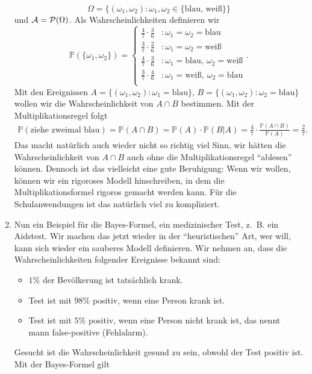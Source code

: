 \begin{beispiel}
\begin{enumerate}[label=(\roman*)]
		$$\Omega = \{ (\omega_1,\omega_2)\colon \omega_1, \omega_2 \in \{ \text{blau, weiß} \} \}$$
		und $\mathcal{A} = \mathcal{P}(\Omega)$. Als Wahrscheinlichkeiten definieren wir
		\[ \mathbb{P}(\{ \omega_1, \omega_2 \}) = \begin{cases}
		\frac{4}{7} \cdot \frac{3}{6}&: \omega_1 = \omega_2 = \text{blau}\\
		\frac{3}{7} \cdot \frac{2}{6}&: \omega_1 = \omega_2 = \text{weiß}\\
		\frac{4}{7} \cdot \frac{3}{6}&: \omega_1 = \text{blau}, \: \omega_2 = \text{weiß}\\		
		\frac{3}{7} \cdot \frac{4}{6}&: \omega_1 = \text{weiß}, \: \omega_2 = \text{blau}\\
		\end{cases}. \]
		Mit den Ereignissen 		
		$A = \{ (\omega_1, \omega_2)\colon \omega_1 = \text{blau} \}$, $B = \{ (\omega_1, \omega_2)\colon \omega_2 = \text{blau} \}$
		wollen wir die Wahrscheinlichkeit von $A\cap B$ bestimmen. Mit der Multiplikationsregel folgt
		\begin{align*}
			\mathbb{P}(\text{ziehe zweimal blau}) = \mathbb{P}(A \cap B) = \mathbb{P}(A) \cdot \mathbb{P}(B|A) =  \frac{4}{7} \cdot \frac{\mathbb{P}(A \cap B)}{\mathbb{P}(A)} = \frac{2}{7}.
		\end{align*}
		Das macht nat\"urlich auch wieder nicht so richtig viel Sinn, wir h\"atten die Wahrscheinlichkeit von $A\cap B$ auch ohne die Multiplikationsregel \enquote{ablesen} k\"onnen. Dennoch ist das vielleicht eine gute Beruhigung: Wenn wir wollen, k\"onnen wir ein rigoroses Modell hinschreiben, in dem die Multiplikationsformel rigoros gemacht werden kann. F\"ur die Schulanwendungen ist das nat\"urlich viel zu kompliziert.		
		\item Nun ein Beispiel f\"ur die Bayes-Formel, ein medizinischer Test, \mbox{z. B.} ein Aidstest. Wir machen das jetzt wieder in der \enquote{heuristischen} Art, wer will, kann sich wieder ein sauberes Modell definieren. Wir nehmen an, dass die Wahrscheinlichkeiten folgender Ereignisse bekannt sind:
		\begin{itemize}
			\item $1\%$ der Bevölkerung ist tats\"achlich krank.
			\item Test ist mit $98\%$ positiv, wenn eine Person krank ist.
			\item Test ist mit $5\%$ positiv, wenn eine Person nicht krank ist, das nennt mann false-positive (Fehlalarm).
		\end{itemize}
		Gesucht ist die Wahrscheinlichkeit gesund zu sein, obwohl der Test positiv ist. Mit der Bayes-Formel gilt

\end{enumerate}
\end{beispiel}
